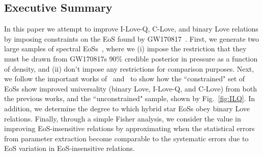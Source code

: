 \documentclass[prd,twocolumn,nofootinbib,superscriptaddress,amsmath,amssymb]{revtex4-1}
\begin{document}
\subsection{Executive Summary}
{}
In this paper we attempt to improve I-Love-Q, C-Love, and binary Love relations by imposing constraints on the EoS found by GW170817~\cite{LIGO:posterior,TheLIGOScientific:2017qsa}.
First, we generate two large samples of spectral EoSs~\cite{Lindblom:2018rfr}, where we (i) impose the restriction that they must be drawn from GW170817s 90\% credible posterior in pressure as a function of density, and (ii) don't impose any restrictions for comparison purposes.
Next, we follow the important works of~\cite{Yagi:binLove} and~\cite{Yagi:ILQ} to show how the ``constrained" set of EoSs show improved universality (binary Love, I-Love-Q, and C-Love) from both the previous works, and the ``unconstrained" sample, shown by Fig.~\ref{fig:ILQ}.
In addition, we determine the degree to which hybrid star EoSs obey binary Love relations.
Finally, through a simple Fisher analysis, we consider the value in improving EoS-insensitive relations by approximating when the statistical errors from parameter extraction become comparable to the systematic errors due to EoS variation in EoS-insensitive relations.
\end{document}
